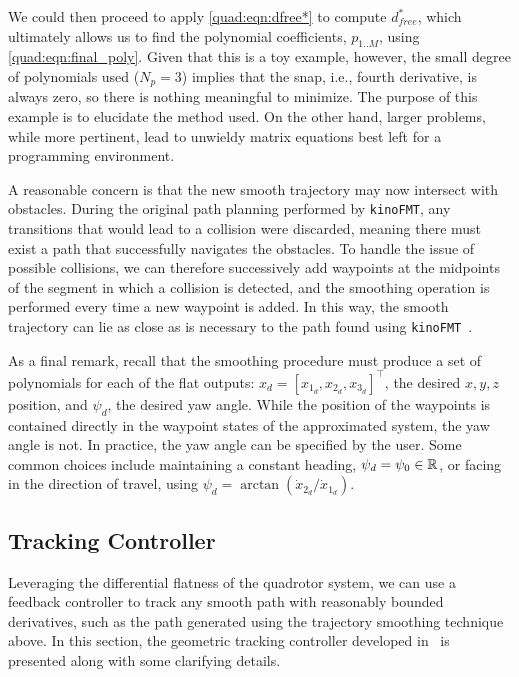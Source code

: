 We could then proceed to apply \autoref{quad:eqn:dfree*} to compute $d_{free}^*$, which ultimately allows us to find the polynomial coefficients, $p_{1..M}$, using \autoref{quad:eqn:final_poly}. Given that this is a toy example, however, the small degree of polynomials used ($N_p = 3$) implies that the snap, i.e., fourth derivative, is always zero, so there is nothing meaningful to minimize. The purpose of this example is to elucidate the method used. On the other hand, larger problems, while more pertinent, lead to unwieldy matrix equations best left for a programming environment.

A reasonable concern is that the new smooth trajectory may now intersect with obstacles. During the original path planning performed by \texttt{kinoFMT}, any transitions that would lead to a collision were discarded, meaning there must exist a path that successfully navigates the obstacles. To handle the issue of possible collisions, we can therefore successively add waypoints at the midpoints of the segment in which a collision is detected, and the smoothing operation is performed every time a new waypoint is added. In this way, the smooth trajectory can lie as close as is necessary to the path found using \texttt{kinoFMT}~\cite{Richter2016}.

As a final remark, recall that the smoothing procedure must produce a set of polynomials for each of the flat outputs: $x_d = {[x_{1_d}, x_{2_d}, x_{3_d}]}^\top$, the desired $x, y, z$ position, and $\psi_d$, the desired yaw angle. While the position of the waypoints is contained directly in the waypoint states of the approximated system, the yaw angle is not. In practice, the yaw angle can be specified by the user. Some common choices include maintaining a constant heading, $\psi_d = \psi_0 \in \mathbb{R}$, or facing in the direction of travel, using $\psi_d = \arctan(\dot{x}_{2_d}/\dot{x}_{1_d})$.





\subsection{Tracking Controller}\label{quad:tracking}

Leveraging the differential flatness of the quadrotor system, we can use a feedback controller to track any smooth path with reasonably bounded derivatives, such as the path generated using the trajectory smoothing technique above. In this section, the geometric tracking controller developed in~\cite{Lee2010} is presented along with some clarifying details.



